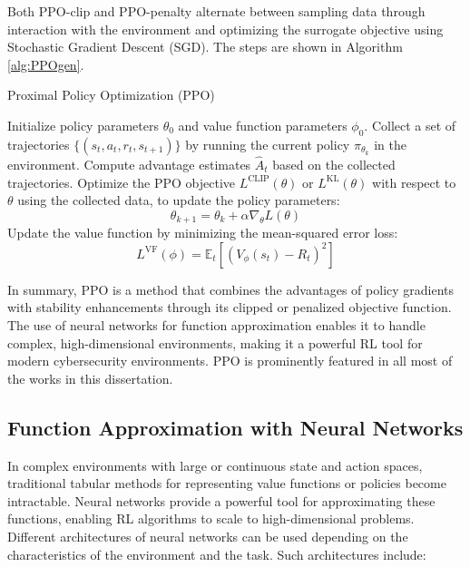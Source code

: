 Both PPO-clip and PPO-penalty alternate between sampling data through interaction with the environment and optimizing the surrogate objective using Stochastic Gradient Descent (\gls{SGD}).
The steps are shown in Algorithm \ref{alg:PPOgen}.

\begin{algorithm}
\caption{Proximal Policy Optimization (PPO)}
\label{alg:PPOgen}
\begin{algorithmic}[1]
\STATE Initialize policy parameters $\theta_0$ and value function parameters $\phi_0$.
    \STATE Collect a set of trajectories $\{(s_t, a_t, r_t, s_{t+1})\}$ by running the current policy $\pi_{\theta_k}$ in the environment.
    \STATE Compute advantage estimates $\hat{A}_t$ based on the collected trajectories.
    \setlength{\abovedisplayskip}{3pt}
    \setlength{\belowdisplayskip}{3pt}
    \STATE Optimize the PPO objective $L^{\text{CLIP}}(\theta)$ or $L^{\text{KL}}(\theta)$ with respect to $\theta$ using the collected data, to update the policy parameters:
    \[
    \theta_{k+1} = \theta_k + \alpha \nabla_\theta L(\theta)
    \]
    \STATE Update the value function by minimizing the mean-squared error loss:
    \[
    L^{\text{VF}}(\phi) = \mathbb{E}_t \left[ (V_{\phi}(s_t) - R_t)^2 \right]
    \]
\ENDFOR
\end{algorithmic}
\end{algorithm}

In summary, \gls{PPO} is a method that combines the advantages of policy gradients with stability enhancements through its clipped or penalized objective function.
The use of neural networks for function approximation enables it to handle complex, high-dimensional environments, making it a powerful \gls{RL} tool for modern cybersecurity environments.
\gls{PPO} is prominently featured in all most of the works in this dissertation.

\subsection{Function Approximation with Neural Networks}

In complex environments with large or continuous state and action spaces, traditional tabular methods for representing value functions or policies become intractable.
Neural networks provide a powerful tool for approximating these functions, enabling RL algorithms to scale to high-dimensional problems.
Different architectures of neural networks can be used depending on the characteristics of the environment and the task.
Such architectures include:

